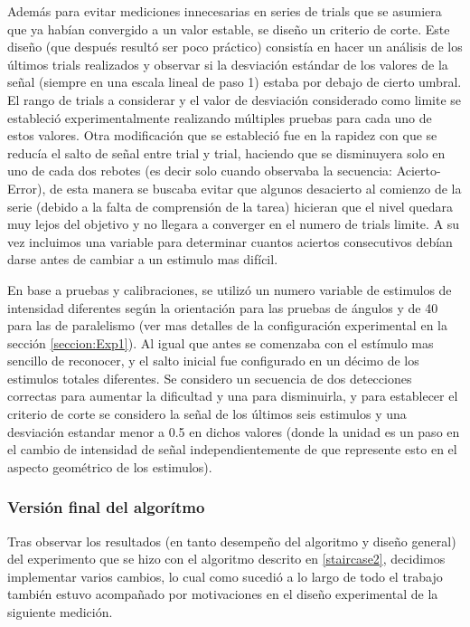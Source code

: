 \documentclass{article}
\begin{document}
    Además para evitar mediciones innecesarias en series de trials que se asumiera que ya habían convergido a un valor estable, se diseño un criterio de corte. Este diseño (que después resultó ser poco práctico) consistía en hacer un análisis de los últimos trials realizados y observar si la desviación estándar de los valores de la señal (siempre en una escala lineal de paso 1) estaba por debajo de cierto umbral. El rango de trials a considerar y el valor de desviación considerado como limite se estableció experimentalmente realizando múltiples pruebas para cada uno de estos valores. Otra modificación que se estableció fue en la rapidez con que se reducía el salto de señal entre trial y trial, haciendo que se disminuyera solo en uno de cada dos rebotes (es decir solo cuando observaba la secuencia: Acierto-Error), de esta manera se buscaba evitar que algunos desacierto al comienzo de la serie (debido a la falta de comprensión de la tarea) hicieran que el nivel quedara muy lejos del objetivo y no llegara a converger en el numero de trials limite. A su vez incluimos una variable para determinar cuantos aciertos consecutivos debían darse antes de cambiar a un estimulo mas difícil. 
    
    En base a pruebas y calibraciones, se utilizó un numero variable de estimulos de intensidad diferentes según la orientación para las pruebas de ángulos y de 40 para las de paralelismo (ver mas detalles de la configuración experimental en la sección \ref{seccion:Exp1}). Al igual que antes se comenzaba con el estímulo mas sencillo de reconocer, y el salto inicial fue configurado en un décimo de los estimulos totales diferentes. Se considero un secuencia de dos detecciones correctas para aumentar la dificultad y una para disminuirla, y para establecer el criterio de corte se considero la señal de los últimos seis estimulos y una desviación estandar menor a 0.5 en dichos valores (donde la unidad es un paso en el cambio de intensidad de señal independientemente de que represente esto en el aspecto geométrico de los estimulos).

    \subsubsection{Versión final del algorítmo} \label{staircase3}
    
    Tras observar los resultados (en tanto desempeño del algoritmo y diseño general) del experimento que se hizo con el algoritmo descrito en \ref{staircase2}, decidimos implementar varios cambios, lo cual como sucedió a lo largo de todo el trabajo también estuvo acompañado por motivaciones en el diseño experimental de la siguiente medición.
    
\end{document}
